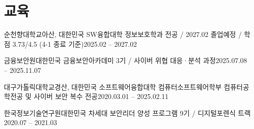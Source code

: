 \section{교육}
  \resumeSubHeadingListStart
    \resumeSubheading
      {순천향대학교}{아산, 대한민국}
      {SW융합대학 정보보호학과 전공 / 2027.02 졸업예정 / 학점 3.73/4.5 (4-1 종료 기준)}{2025.02 -- 2027.02}

    \resumeSubheading
      {금융보안원}{대한민국}
      {금융보안아카데미 3기 / 사이버 위협 대응·분석 과정}{2025.07.08 -- 2025.11.07}

    \resumeSubheading
      {대구가톨릭대학교}{경산, 대한민국}
      {소프트웨어융합대학 컴퓨터소프트웨어학부 컴퓨터공학전공 및 사이버 보안 복수 전공}{2020.03.01 -- 2025.02.11}
      \resumeItemListStart
      \resumeItemListEnd

    \resumeSubheading
      {한국정보기술연구원}{대한민국}
      {차세대 보안리더 양성 프로그램 9기 / 디지털포렌식 트랙}{2020.07 -- 2021.03}
  \resumeSubHeadingListEnd
